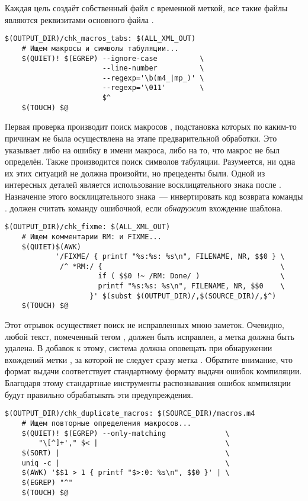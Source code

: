 Каждая цель создаёт собственный файл с временной меткой, все такие
файлы являются реквизитами основного файла .

\begin{verbatim}
$(OUTPUT_DIR)/chk_macros_tabs: $(ALL_XML_OUT)
    # Ищем макросы и символы табуляции...
    $(QUIET)! $(EGREP) --ignore-case          \
                       --line-number          \
                       --regexp='\b(m4_|mp_)' \
                       --regexp='\011'        \
                       $^
    $(TOUCH) $@
\end{verbatim}

Первая проверка производит поиск макросов , подстановка
которых по каким-то причинам не была осуществлена на этапе
предварительной обработки. Это указывает либо на ошибку в имени
макроса, либо на то, что макрос не был определён. Также производится
поиск символов табуляции. Разумеется, ни одна их этих ситуаций не
должна произойти, но прецеденты были. Одной из интересных деталей
является использование восклицательного знака после
\command{\$(QUIET)}. Назначение этого восклицательного знака~---
инвертировать код возврата команды \utility{egrep}. \GNUmake{} должен
считать команду ошибочной, если \utility{egrep} \emph{обнаружит}
вхождение шаблона.

\begin{verbatim}
$(OUTPUT_DIR)/chk_fixme: $(ALL_XML_OUT)
    # Ищем комментарии RM: и FIXME...
    $(QUIET)$(AWK)
            '/FIXME/ { printf "%s:%s: %s\n", FILENAME, NR, $$0 } \
             /^ *RM:/ {                                          \
                      if ( $$0 !~ /RM: Done/ )                   \
                      printf "%s:%s: %s\n", FILENAME, NR, $$0    \
                    }' $(subst $(OUTPUT_DIR)/,$(SOURCE_DIR)/,$^)
    $(TOUCH) $@
\end{verbatim}

Этот отрывок осуществяет поиск не исправленных мною заметок. Очевидно,
любой текст, помеченный тегом \command{FIXME}, должен быть исправлен,
а метка должна быть удалена. В добавок к этому, система должна
оповещать при обнаружении вхождений метки , за которой не
следует сразу метка . Обратите внимание, что формат
выдачи  соответствует стандартному формату выдачи
ошибок компиляции. Благодаря этому стандартные инструменты
распознавания ошибок компиляции будут правильно обрабатывать эти
предупреждения.

\begin{verbatim}
$(OUTPUT_DIR)/chk_duplicate_macros: $(SOURCE_DIR)/macros.m4
    # Ищем повторные определения макросов...
    $(QUIET)! $(EGREP) --only-matching              \
        "\[^]+'," $< |                              \
    $(SORT) |                                       \
    uniq -c |                                       \
    $(AWK) '$$1 > 1 { printf "$>:0: %s\n", $$0 }' | \
    $(EGREP) "^"
    $(TOUCH) $@
\end{verbatim}


